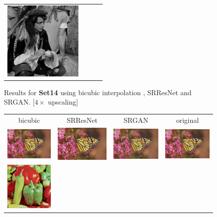 \documentclass[10pt,twocolumn,letterpaper]{article}
\begin{document}
\begin{figure}[h!]
\begin{tabular}{cccc}
\includegraphics[width=1.5in]{images/used/appendix/jpg/Set14/man_HR} \\
\end{tabular}
\label{fig:app_Set14b}
\caption{Results for \textbf{Set14} using bicubic interpolation , SRResNet and SRGAN. [$4\times$ upscaling]}
\end{figure}

\begin{figure}[h!]
\begin{tabular}{cccc}
bicubic & SRResNet & SRGAN & original \\
\includegraphics[width=1.5in]{images/used/appendix/jpg/Set14/monarch_bicubic}&
\includegraphics[width=1.5in]{images/used/appendix/jpg/Set14/monarch_SRResNet-MSE} &
\includegraphics[width=1.5in]{images/used/appendix/jpg/Set14/monarch_SRGAN-VGG54} &
\includegraphics[width=1.5in]{images/used/appendix/jpg/Set14/monarch_HR} \\
\includegraphics[width=1.5in]{images/used/appendix/jpg/Set14/pepper_bicubic}&

\end{tabular}
\end{figure}
\end{document}
